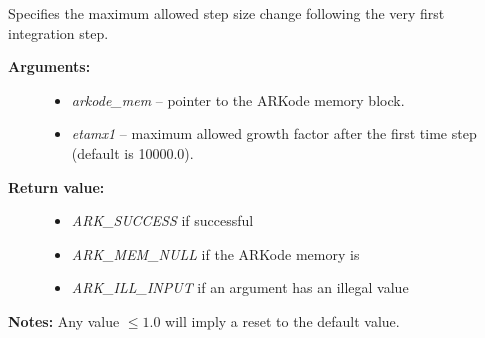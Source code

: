 \documentclass[letterpaper,10pt,english]{sphinxmanual}
\begin{document}
\begin{fulllineitems}
\label{c_interface/User_callable:ARKodeSetMaxFirstGrowth}
Specifies the maximum allowed step size change following the very
first integration step.
\begin{description}
\item[{\textbf{Arguments:}}] \leavevmode\begin{itemize}
\item {} 
\emph{arkode\_mem} -- pointer to the ARKode memory block.

\item {} 
\emph{etamx1} -- maximum allowed growth factor after the first time
step (default is 10000.0).

\end{itemize}

\item[{\textbf{Return value:}}] \leavevmode\begin{itemize}
\item {} 
\emph{ARK\_SUCCESS} if successful

\item {} 
\emph{ARK\_MEM\_NULL} if the ARKode memory is 

\item {} 
\emph{ARK\_ILL\_INPUT} if an argument has an illegal value

\end{itemize}

\end{description}

\textbf{Notes:} Any value $\le 1.0$ will imply a reset to the default value.

\end{fulllineitems}

\end{document}
